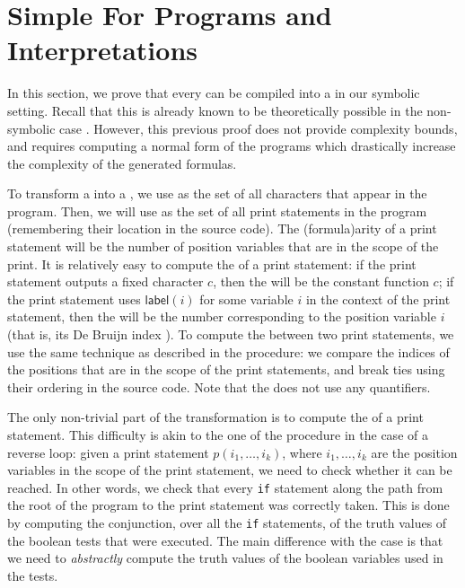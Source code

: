 \section{Simple For Programs and Interpretations}
\label{sec:low-level}



In this section, we prove that every  can be compiled
into a  in our symbolic setting. Recall that
this is already known to be theoretically possible in the non-symbolic case
\cite{bojanczyk2018polyregular}. However, this previous proof does not provide
complexity bounds, and requires computing a normal form of the programs
 which drastically increase the complexity of the
generated formulas.

To transform a  into a ,
we use as  the set of all
characters that appear in the program. Then, we will use as  the set of all print statements in the program (remembering their
location in the source code). The \kl(formula){arity} of a print statement will be the
number of position variables that are in the scope of the print. It is
relatively easy to compute the  of a print statement: if
the print statement outputs a fixed character $c$, then the  will be the constant function $c$; if the print statement uses
$\mathsf{label}(i)$ for some variable $i$ in the context of the print
statement, then the  will be the number corresponding to
the position variable $i$ (that is, its De Bruijn index \cite{DEBRUJ72}). To
compute the  between two print statements, we use the same
technique as described in the  procedure: we compare the
indices of the positions that are in the scope of the print statements, and
break ties using their ordering in the source code. Note that the  does not use any quantifiers.

The only non-trivial part of the transformation is to compute the  of a print statement. This difficulty is akin to the one of the
 procedure in the case of a reverse loop: given a print
statement $p(i_1, \dots, i_k)$, where $i_1, \dots, i_k$ are the position
variables in the scope of the print statement, we need to check whether it can
be reached. In other words, we check that every \texttt{if} statement along the
path from the root of the program to the print statement was correctly taken.
This is done by computing the conjunction, over all the \texttt{if} statements,
of the truth values of the boolean tests that were executed. The main
difference with the  case is that we need to
\emph{abstractly} compute the truth values of the boolean variables used in the
tests.

